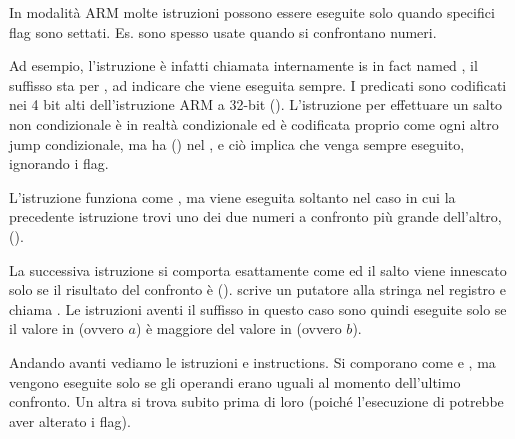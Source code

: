 \label{subsec:jcc_ARM}

\mysubparagraph{\OptimizingKeilVI (\ARMMode)}




In modalità ARM molte istruzioni possono essere eseguite solo quando specifici flag sono settati.
Es. sono spesso usate quando si confrontano numeri.


Ad esempio, l'istruzione \ADD è infatti chiamata internamente is in fact named , il suffisso  sta per
, ad indicare che viene eseguita sempre.
I predicati sono codificati nei 4 bit alti dell'istruzione ARM a 32-bit ().
L'istruzione  per effettuare un salto non condizionale è in realtà condizionale ed è codificata proprio come ogni altro
jump condizionale, ma ha  () nel , e ciò implica che venga sempre eseguito, ignorando i flag.


L'istruzione  funziona come , ma viene eseguita soltanto nel caso in cui la precedente istruzione \CMP
trovi uno dei due numeri a confronto più grande dell'altro, ().


La successiva istruzione  si comporta esattamente come  
ed il salto viene innescato solo se il risultato del confronto è (). 
 scrive un putatore alla stringa  nel registro  e  chiama \printf.
Le istruzioni aventi il suffisso  in questo caso sono quindi eseguite solo se il valore in  (ovvero $a$) è maggiore del valore 
in  (ovvero $b$).


Andando avanti vediamo le istruzioni  e  instructions.
Si comporano come  e , ma vengono eseguite solo se gli operandi erano uguali al momento dell'ultimo confronto.
Un altra \CMP si trova subito prima di loro (poiché l'esecuzione di \printf potrebbe aver alterato i flag).

